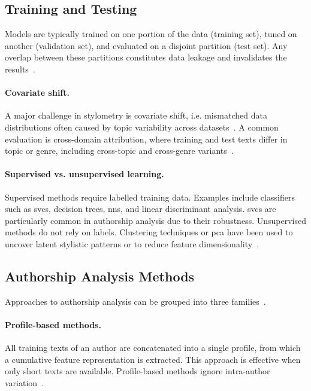 \subsection{Training and Testing}

Models are typically trained on one portion of the data (training set), tuned on another (validation set), and evaluated on a disjoint partition (test set). 
Any overlap between these partitions constitutes data leakage and invalidates the results~\citep{bischoff_importance_2020,altakrori_topic_2021,boenninghoff_o2d2_2021}. 

\paragraph{Covariate shift.}
A major challenge in stylometry is covariate shift, i.e. mismatched data distributions often caused by topic variability across datasets~\citep{boenninghoff_o2d2_2021}. A common evaluation is cross-domain attribution, where training and test texts differ in topic or genre, including cross-topic and cross-genre variants~\citep{barlas_cross_domain_2020}.

\paragraph{Supervised vs. unsupervised learning.}  
Supervised methods require labelled training data. 
Examples include classifiers such as \acp{svc}, decision trees, \acp{nn}, and linear discriminant analysis. 
\acp{svc} are particularly common in authorship analysis due to their robustness. 
Unsupervised methods do not rely on labels.
Clustering techniques or \acl{pca} have been used to uncover latent stylistic patterns or to reduce feature dimensionality~\citep{abbasi_writeprints_2008}.


\subsection{Authorship Analysis Methods}
\label{subsec:attribution_methods}

Approaches to authorship analysis can be grouped into three families~\citep{stamatatos_survey_2009}.

\paragraph{Profile-based methods.} 
All training texts of an author are concatenated into a single profile, from which a cumulative feature representation is extracted. 
This approach is effective when only short texts are available.
Profile-based methods ignore intra-author variation~\citep{stamatatos_survey_2009,elmanarelbouanani_authorship_2014,neal_surveying_2018}.  


